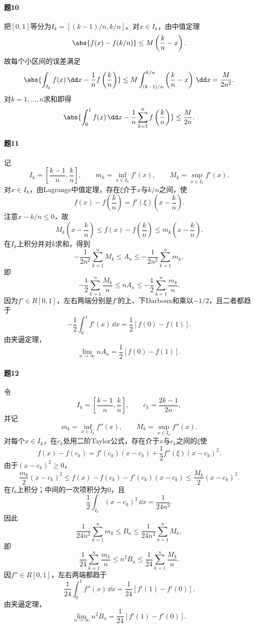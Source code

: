 \paragraph{题10}
\begin{xsolution}
把$[0,1]$等分为$I_k=[(k-1)/n,k/n]$。对$x\in I_k$，由中值定理
\[
 \abs{f(x)-f(k/n)}\le M\left(\frac kn-x\right).
\]
故每个小区间的误差满足
\[
 \abs{\int_{I_k}f(x)\,\dd x-\frac1n f\left(\frac kn\right)}
 \le M\int_{(k-1)/n}^{k/n}\left(\frac kn-x\right)\,\dd x
 =\frac{M}{2n^2}.
\]
对$k=1,\ldots,n$求和即得
\[
 \abs{\int_0^1f(x)\,\dd x-\frac1n\sum_{k=1}^nf\left(\frac kn\right)}
 \le\frac{M}{2n}.
\]
\end{xsolution}

\paragraph{题11}
\begin{xsolution}
记
\[
 I_k=\left[\frac{k-1}{n},\frac kn\right],\qquad
 m_k=\inf_{x\in I_k}f'(x),\qquad
 M_k=\sup_{x\in I_k}f'(x).
\]
对$x\in I_k$，由Lagrange中值定理，存在$\xi$介于$x$与$k/n$之间，使
\[
 f(x)-f\left(\frac kn\right)
 =f'(\xi)\left(x-\frac kn\right).
\]
注意$x-k/n\le0$，故
\[
 M_k\left(x-\frac kn\right)
 \le f(x)-f\left(\frac kn\right)
 \le m_k\left(x-\frac kn\right).
\]
在$I_k$上积分并对$k$求和，得到
\[
 -\frac1{2n^2}\sum_{k=1}^nM_k
 \le A_n
 \le-\frac1{2n^2}\sum_{k=1}^nm_k,
\]
即
\[
 -\frac12\sum_{k=1}^n\frac{M_k}{n}
 \le nA_n
 \le-\frac12\sum_{k=1}^n\frac{m_k}{n}.
\]
因为$f'\in R[0,1]$，左右两端分别是$f'$的上、下Darboux和乘以$-1/2$，且二者都趋于
\[
 -\frac12\int_0^1f'(x)\,\dd x
 =\frac12[f(0)-f(1)].
\]
由夹逼定理，
\[
 \boxed{\lim_{n\to\infty}nA_n=\frac12[f(0)-f(1)]}.
\]
\end{xsolution}

\paragraph{题12}
\begin{xsolution}
令
\[
 I_k=\left[\frac{k-1}{n},\frac kn\right],\qquad
 c_k=\frac{2k-1}{2n},
\]
并记
\[
 m_k=\inf_{x\in I_k}f''(x),\qquad
 M_k=\sup_{x\in I_k}f''(x).
\]
对每个$x\in I_k$，在$c_k$处用二阶Taylor公式，存在介于$x$与$c_k$之间的$\xi$使
\[
 f(x)-f(c_k)
 =f'(c_k)(x-c_k)+\frac12f''(\xi)(x-c_k)^2.
\]
由于$(x-c_k)^2\ge0$，
\[
 \frac{m_k}{2}(x-c_k)^2
 \le f(x)-f(c_k)-f'(c_k)(x-c_k)
 \le\frac{M_k}{2}(x-c_k)^2.
\]
在$I_k$上积分；中间的一次项积分为0，且
\[
 \frac12\int_{I_k}(x-c_k)^2\,\dd x=\frac1{24n^3}.
\]
因此
\[
 \frac1{24n^3}\sum_{k=1}^nm_k
 \le B_n
 \le\frac1{24n^3}\sum_{k=1}^nM_k,
\]
即
\[
 \frac1{24}\sum_{k=1}^n\frac{m_k}{n}
 \le n^2B_n
 \le\frac1{24}\sum_{k=1}^n\frac{M_k}{n}.
\]
因$f''\in R[0,1]$，左右两端都趋于
\[
 \frac1{24}\int_0^1f''(x)\,\dd x
 =\frac1{24}[f'(1)-f'(0)].
\]
由夹逼定理，
\[
 \boxed{\lim_{n\to\infty}n^2B_n
 =\frac1{24}[f'(1)-f'(0)]}.
\]
\end{xsolution}

